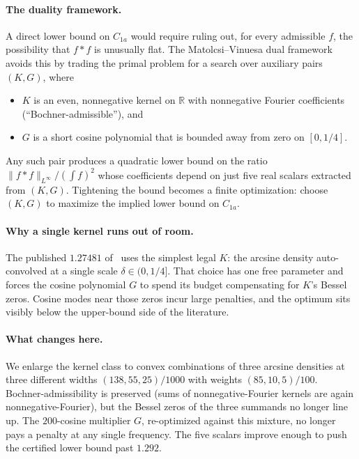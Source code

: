 \documentclass[11pt, letterpaper]{article}
\theoremstyle{plain}
\theoremstyle{definition}
\newcommand{\R}{\mathbb{R}}
\newcommand{\Linf}{L^\infty}
\begin{document}
\paragraph{The duality framework.}
A direct lower bound on $C_{1a}$ would require ruling out, for every
admissible $f$, the possibility that $f*f$ is unusually flat.  The
Matolcsi--Vinuesa dual framework~\cite{MV10} avoids this by trading the
primal problem for a search over auxiliary pairs $(K,G)$, where
\begin{itemize}[leftmargin=2em]
\item $K$ is an even, nonnegative kernel on $\R$ with nonnegative
      Fourier coefficients (``Bochner-admissible''), and
\item $G$ is a short cosine polynomial that is bounded away from zero
      on $[0,1/4]$.
\end{itemize}
Any such pair produces a quadratic lower bound on the ratio
$\|f*f\|_{\Linf}/(\int f)^2$ whose coefficients depend on just five
real scalars extracted from $(K,G)$.  Tightening the bound becomes a
finite optimization: choose $(K,G)$ to maximize the implied lower bound
on $C_{1a}$.

\paragraph{Why a single kernel runs out of room.}
The published $1.27481$ of~\cite{MV10} uses the simplest legal $K$: the
arcsine density auto-convolved at a single scale $\delta\in(0,1/4]$.
That choice has one free parameter and forces the cosine polynomial
$G$ to spend its budget compensating for $K$'s Bessel zeros.  Cosine
modes near those zeros incur large penalties, and the optimum sits
visibly below the upper-bound side of the literature.

\paragraph{What changes here.}
We enlarge the kernel class to convex combinations of three arcsine
densities at three different widths $(138,55,25)/1000$ with weights
$(85,10,5)/100$.  Bochner-admissibility is preserved (sums of
nonnegative-Fourier kernels are again nonnegative-Fourier), but the
Bessel zeros of the three summands no longer line up.  The
$200$-cosine multiplier $G$, re-optimized against this mixture, no
longer pays a penalty at any single frequency.  The five scalars
improve enough to push the certified lower bound past $1.292$.
\end{document}
